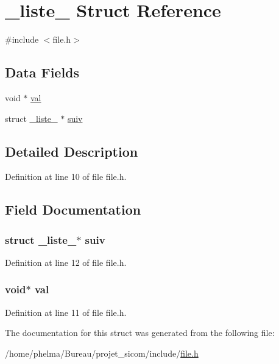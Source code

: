 \hypertarget{struct__liste__}{\section{\-\_\-liste\-\_\- Struct Reference}
\label{struct__liste__}
}


{\ttfamily \#include $<$file.\-h$>$}

\subsection*{Data Fields}
\begin{DoxyCompactItemize}
\item 
void $\ast$ \hyperlink{struct__liste___ab03f36f103bdec81305fd301f1f93885}{val}
\item 
struct \hyperlink{struct__liste__}{\-\_\-liste\-\_\-} $\ast$ \hyperlink{struct__liste___a224c1138c8377ec8fc3eb576745afd8b}{suiv}
\end{DoxyCompactItemize}


\subsection{Detailed Description}


Definition at line 10 of file file.\-h.



\subsection{Field Documentation}
\hypertarget{struct__liste___a224c1138c8377ec8fc3eb576745afd8b}{
\subsubsection[{suiv}]{\setlength{\rightskip}{0pt plus 5cm}struct {\bf \-\_\-liste\-\_\-}$\ast$ suiv}}\label{struct__liste___a224c1138c8377ec8fc3eb576745afd8b}


Definition at line 12 of file file.\-h.

\hypertarget{struct__liste___ab03f36f103bdec81305fd301f1f93885}{
\subsubsection[{val}]{\setlength{\rightskip}{0pt plus 5cm}void$\ast$ val}}\label{struct__liste___ab03f36f103bdec81305fd301f1f93885}


Definition at line 11 of file file.\-h.



The documentation for this struct was generated from the following file\-:\begin{DoxyCompactItemize}
\item 
/home/phelma/\-Bureau/projet\-\_\-sicom/include/\hyperlink{file_8h}{file.\-h}\end{DoxyCompactItemize}
